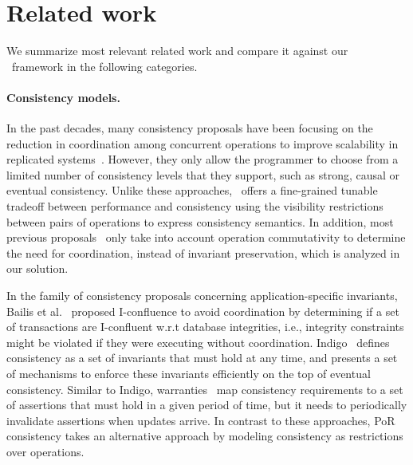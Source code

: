\section{Related work}
\label{ch:por:sect:related}
We summarize most relevant related work and compare it against our \PRCN\ framework in the following
categories.

\paragraph{Consistency models.} In the past decades, 
many consistency proposals have been focusing on the reduction in coordination
among concurrent operations to improve scalability 
in replicated systems~\cite{Ladin1992LazyReplication,
Sovran2011PSI, Li2012RedBlue, Li2014SIEVE, Alvaro2014Blazes, Alvaro2011Bloom, Zhang2015InconsRep}. 
However, they only allow the programmer to choose from a limited number of
consistency levels that they support, such as strong, causal or eventual consistency.
Unlike these approaches, \PRCN\ offers a fine-grained tunable tradeoff
between performance and consistency using the 
visibility restrictions between pairs of operations to express consistency semantics.
In addition, most previous proposals~\cite{Alvaro2014Blazes, Ladin1992LazyReplication,
Sovran2011PSI, Alvaro2011Bloom} only take into account operation commutativity
to determine the need for coordination, instead of invariant preservation, which
is analyzed in our solution.

In the family of consistency proposals concerning application-specific invariants,
Bailis et al.~\cite{Bailis2014Avoid} proposed I-confluence
to avoid coordination by determining if a set of transactions are I-confluent
w.r.t database integrities, i.e., 
integrity constraints might be violated if they were executing without coordination.
Indigo~\cite{Balegas2015Eventual} defines consistency as 
a set of invariants that must hold at any time, and presents a set of mechanisms to enforce these invariants 
efficiently on the top of eventual consistency. Similar to Indigo, warranties~\cite{Liu2014Warranties} 
map consistency requirements to a set of assertions that must hold in a given period of time,
but it needs to periodically invalidate assertions when updates arrive. In contrast to
these approaches, PoR consistency takes an alternative approach 
by modeling consistency as restrictions over operations.

